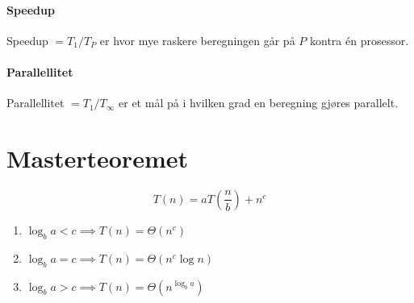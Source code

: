 \documentclass[a4paper]{article}
\begin{document}
\paragraph{Speedup} Speedup $= T_1 / T_P$ er hvor mye raskere beregningen går på $P$ kontra én prosessor.
\paragraph{Parallellitet} Parallellitet $= T_1 / T_\infty$ er et mål på i hvilken grad en beregning gjøres parallelt.



\section{Masterteoremet}
$$T(n) = aT\left(\frac{n}{b}\right) + n^c$$
\begin{enumerate}
\item $\log_b a < c \implies T(n) = \Theta(n^c)$
\item $\log_b a = c \implies T(n) = \Theta(n^c \log n)$
\item $\log_b a > c \implies T(n) = \Theta(n^{\log_b a})$
\end{enumerate}
\end{document}
